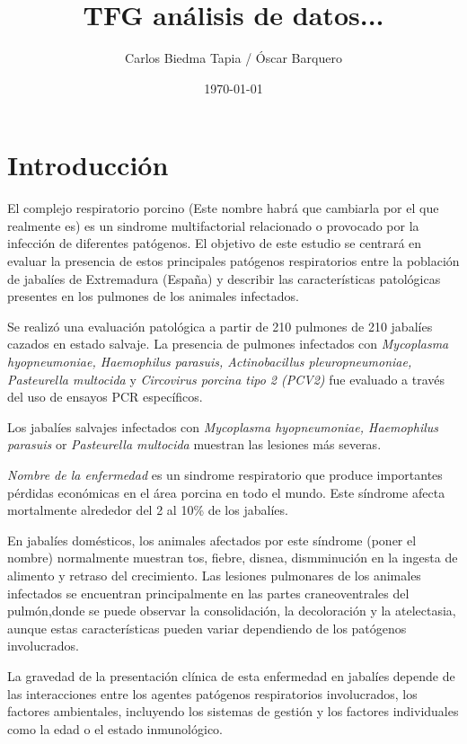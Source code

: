 \documentclass[12pt,a4paper,Spanish]{book}
\author{Carlos Biedma Tapia / Óscar Barquero}
\title{TFG análisis de datos...}
\date{\today}
\begin{document}
\maketitle
\tableofcontents
\listoffigures


\chapter{Introducción}
El complejo respiratorio porcino (Este nombre habrá que cambiarla por el que realmente es) es un sindrome multifactorial relacionado o provocado por la infección de diferentes patógenos. El objetivo de este estudio se centrará en evaluar la presencia de estos principales patógenos respiratorios entre la población de jabalíes de Extremadura (España) y describir las características patológicas presentes en los pulmones de los animales infectados.

Se realizó una evaluación patológica a partir de 210 pulmones de 210 jabalíes cazados en estado salvaje. La presencia de pulmones infectados con \textit{Mycoplasma hyopneumoniae, Haemophilus parasuis, Actinobacillus pleuropneumoniae, Pasteurella multocida} y \textit{Circovirus porcina tipo 2 (PCV2)} fue evaluado a través del uso de ensayos PCR específicos.

Los jabalíes salvajes infectados con \textit{Mycoplasma hyopneumoniae, Haemophilus parasuis} or
\textit{Pasteurella multocida} muestran las lesiones más severas.

\textit{Nombre de la enfermedad} es un sindrome respiratorio que produce importantes pérdidas económicas en el área porcina en todo el mundo. Este síndrome afecta mortalmente alrededor del 2 al 10\% de los jabalíes.

En jabalíes domésticos, los animales afectados por este síndrome (poner el nombre) normalmente muestran tos, fiebre, disnea, dismminución en la ingesta de alimento y retraso del crecimiento. Las lesiones pulmonares de los animales infectados se encuentran principalmente en las partes craneoventrales del pulmón,donde se puede observar la consolidación, la decoloración y la atelectasia, aunque estas características pueden variar dependiendo de los patógenos involucrados.

La gravedad de la presentación clínica de esta enfermedad en jabalíes depende de las interacciones entre los agentes patógenos respiratorios involucrados, los factores ambientales, incluyendo los sistemas de gestión y los factores individuales como la edad o el estado inmunológico.
\end{document}
